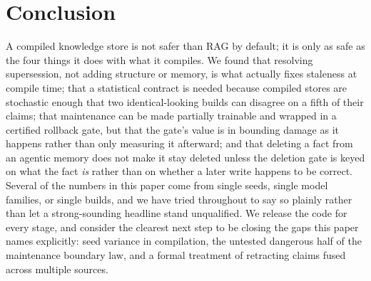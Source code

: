 \section{Conclusion}
\label{sec:conclusion}

A compiled knowledge store is not safer than RAG by default; it is only as safe as the four things it does with what it compiles. We found that resolving supersession, not adding structure or memory, is what actually fixes staleness at compile time; that a statistical contract is needed because compiled stores are stochastic enough that two identical-looking builds can disagree on a fifth of their claims; that maintenance can be made partially trainable and wrapped in a certified rollback gate, but that the gate's value is in bounding damage as it happens rather than only measuring it afterward; and that deleting a fact from an agentic memory does not make it stay deleted unless the deletion gate is keyed on what the fact \emph{is} rather than on whether a later write happens to be correct. Several of the numbers in this paper come from single seeds, single model families, or single builds, and we have tried throughout to say so plainly rather than let a strong-sounding headline stand unqualified. We release the code for every stage, and consider the clearest next step to be closing the gaps this paper names explicitly: seed variance in compilation, the untested dangerous half of the maintenance boundary law, and a formal treatment of retracting claims fused across multiple sources.
